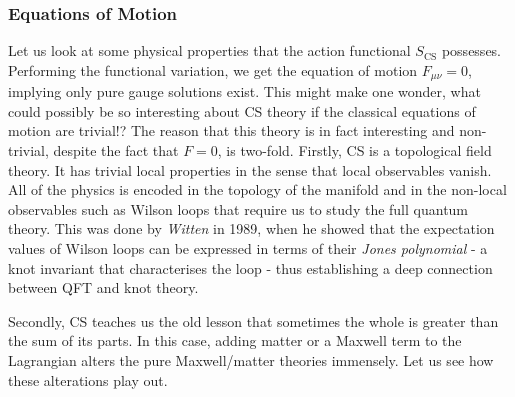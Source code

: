 \subsubsection*{Equations of Motion}
    Let us look at some physical properties that the action functional $S_{\text{CS}}$ possesses. Performing the functional variation, we get the equation of motion $F_{\mu \nu}=0$, implying only pure gauge solutions exist. This might make one wonder, what could possibly be so interesting about CS theory if the classical equations of motion are trivial!?
    The reason that this theory is in fact interesting and non-trivial, despite the fact that $F=0$, is two-fold. Firstly, CS is a topological field theory. It has trivial local properties in the sense that local observables vanish. All of the physics is encoded in the topology of the manifold and in the non-local observables such as Wilson loops that require us to study the full quantum theory. This was done by \textit{Witten} \cite{Witten1989} in 1989, when he showed that the expectation values of Wilson loops can be expressed in terms of their \textit{Jones polynomial} - a knot invariant that characterises the loop - thus establishing a deep connection between QFT and knot theory.

    Secondly, CS teaches us the old lesson that sometimes the whole is greater than the sum of its parts. In this case, adding matter or a Maxwell term to the Lagrangian alters the pure Maxwell/matter theories immensely. Let us see how these alterations play out.

